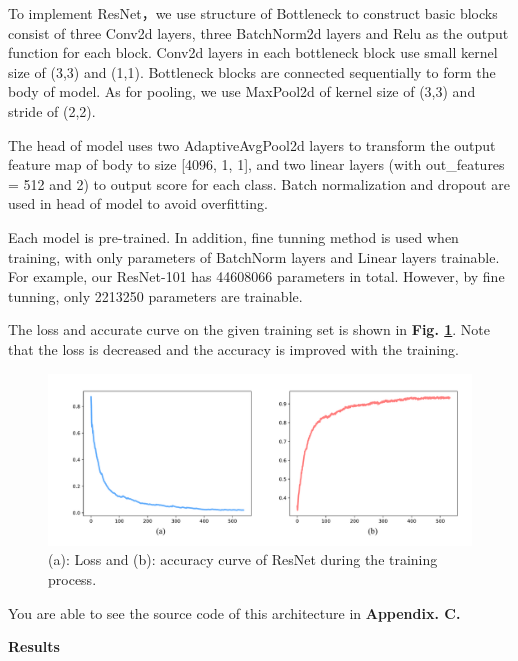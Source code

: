 \documentclass[a4paper]{article}
\begin{document}
\large{

To implement \textsf{ResNet}，we use structure of Bottleneck to construct basic blocks  consist of three Conv2d layers, three BatchNorm2d layers and Relu as the output function for each block. Conv2d layers in each bottleneck block use small kernel size of (3,3) and (1,1). Bottleneck blocks are connected sequentially to form the body of model. As for pooling, we use MaxPool2d of kernel size of (3,3) and stride of (2,2). 

The head of model uses two AdaptiveAvgPool2d layers to transform the output feature map of body to size [4096, 1, 1], and two linear layers (with out\_features = 512 and 2) to output score for each class. Batch normalization and dropout are used in head of model to avoid overfitting.

Each model is pre-trained. In addition, fine tunning method is used when training, with only parameters of BatchNorm layers and Linear layers trainable. For example, our \textsf{ResNet-101} has 44608066 parameters in total. However, by fine tunning, only 2213250 parameters are trainable.

The loss and accurate curve on the given training set is shown in \textbf{Fig. \ref{resacc}}. Note that the loss is decreased and the accuracy is improved with the training.

\begin{figure}[h]
\centering
\includegraphics[width=15cm]{res_acc.pdf}
\caption{(a): Loss and (b): accuracy curve of \textsf{ResNet} during the training process.}
\label{resacc}
\end{figure}

}

\large{You are able to see the source code of this architecture in \textbf{Appendix. C.}}
\vspace{2mm}
\begin{center}
\large\textbf{Results} \\
\end{center}
\end{document}
